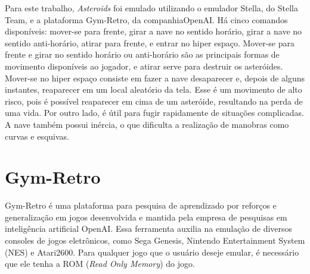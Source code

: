 Para este trabalho, \textit{Asteroids} foi emulado utilizando o emulador Stella, do Stella Team, e a plataforma Gym-Retro, da companhiaOpenAI.
Há cinco comandos disponíveis: mover-se para frente, girar a nave no sentido horário, girar a nave no sentido anti-horário, atirar para frente, e entrar no hiper espaço. Mover-se para frente e girar no sentido horário ou anti-horário são as principais formas de movimento disponíveis ao jogador, e atirar serve para destruir os asteróides. Mover-se no hiper espaço consiste em fazer a nave desaparecer e, depois de alguns instantes, reaparecer em um local aleatório da tela. Esse é um movimento de alto risco, pois é possível reaparecer em cima de um asteróide, resultando na perda de uma vida. Por outro lado, é útil para fugir rapidamente de situações complicadas.
A nave também possui inércia, o que dificulta a realização de manobras como curvas e esquivas.

\section{Gym-Retro}
\label{sec:gymretro}

Gym-Retro é uma plataforma para pesquisa de aprendizado por reforços e generalização em jogos desenvolvida e mantida pela empresa de pesquisas em inteligência artificial OpenAI. Essa ferramenta auxilia na emulação de diversos consoles de jogos eletrônicos, como Sega Genesis, Nintendo Entertainment System (NES) e Atari2600. Para qualquer jogo que o usuário deseje emular, é necessário que ele tenha a ROM (\textit{Read Only Memory}) do jogo.

